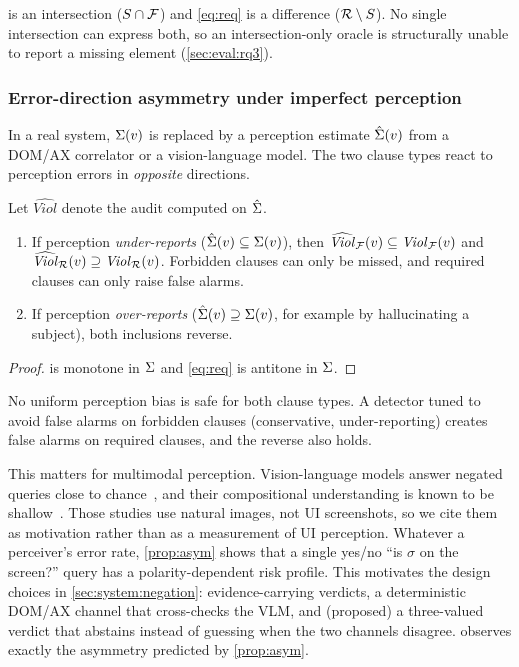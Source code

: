  is an intersection ($S\cap\mathcal{F}$) and \cref{eq:req} is a
difference ($\mathcal{R}\setminus S$). No single intersection can express both, so an
intersection-only oracle is structurally unable to report a missing element
(\cref{sec:eval:rq3}).

\subsubsection{Error-direction asymmetry under imperfect perception}
\label{sec:model:asym}

In a real system, $\Sigma(v)$ is replaced by a perception estimate $\hat{\Sigma}(v)$
from a DOM/AX correlator or a vision-language model. The two clause types react
to perception errors in \emph{opposite} directions.

\begin{proposition}
\label{prop:asym}
Let $\widehat{\mathit{Viol}}$ denote the audit computed on $\hat{\Sigma}$.
\begin{enumerate}
  \item If perception \emph{under-reports} ($\hat{\Sigma}(v)\subseteq\Sigma(v)$), then
    $\widehat{\mathit{Viol}}_{\mathcal{F}}(v)\subseteq\mathit{Viol}_{\mathcal{F}}(v)$ and
    $\widehat{\mathit{Viol}}_{\mathcal{R}}(v)\supseteq\mathit{Viol}_{\mathcal{R}}(v)$. Forbidden
    clauses can only be missed, and required clauses can only raise false
    alarms.
  \item If perception \emph{over-reports} ($\hat{\Sigma}(v)\supseteq\Sigma(v)$, for
    example by hallucinating a subject), both inclusions reverse.
\end{enumerate}
\end{proposition}
\begin{proof}
 is monotone in $\Sigma$ and \cref{eq:req} is antitone in $\Sigma$.
\end{proof}

\begin{corollary}
No uniform perception bias is safe for both clause types. A detector tuned to
avoid false alarms on forbidden clauses (conservative, under-reporting) creates
false alarms on required clauses, and the reverse also holds.
\end{corollary}

This matters for multimodal perception. Vision-language models answer negated
queries close to chance~\cite{alhamoud2025negation}, and their compositional
understanding is known to be shallow~\cite{yuksekgonul2023aro,ma2023crepe}.
Those studies use natural images, not UI screenshots, so we cite them as
motivation rather than as a measurement of UI perception. Whatever a
perceiver's error rate, \cref{prop:asym} shows that a single yes/no ``is
$\sigma$ on the screen?'' query has a polarity-dependent risk profile. This motivates the design
choices in \cref{sec:system:negation}: evidence-carrying verdicts, a
deterministic DOM/AX channel that cross-checks the VLM, and (proposed) a
three-valued verdict that abstains instead of guessing when the two channels
disagree.  observes exactly the asymmetry predicted by
\cref{prop:asym}.

